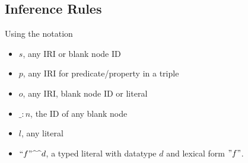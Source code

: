 \documentclass{article}
\begin{document}
\subsection{Inference Rules}
Using the notation
\begin{itemize}
\item $s$, any IRI or blank node ID
\item $p$, any IRI for predicate/property in a triple
\item $o$, any IRI, blank node ID or literal
\item $\_:n$, the ID of any blank node
\item $l$, any literal
\item $``f"\text{\textasciicircum \textasciicircum }d$, a typed literal with datatype $d$ and lexical form $"f"$.
\end{itemize}
\end{document}
